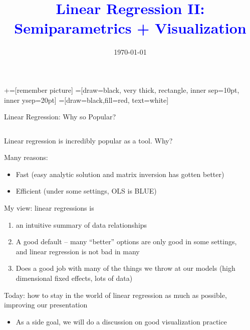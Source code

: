 \documentclass[notes,11pt, aspectratio=169]{beamer}
\title[]{\textcolor{blue}{Linear Regression II: Semiparametrics + Visualization}}
\author[PGP]{}
\institute[FRBNY]{\small{Paul Goldsmith-Pinkham}}
\date{\today}
\newcommand\1{\operatorname{\mathbbm{1}}\indicatorfence}
\newenvironment{wideitemize}{\itemize\addtolength{\itemsep}{10pt}}{\enditemize}
\begin{document}
\newcommand\marktopleft[1]{%
    \tikz[overlay,remember picture] 
        \node (marker-#1-a) at (-.3em,.3em) {};%
}
\newcommand\markbottomright[2]{%
    \tikz[overlay,remember picture] 
        \node (marker-#1-b) at (0em,0em) {};%
}
+=[remember picture] 
 =[draw=black, very thick, rectangle, inner sep=10pt, inner ysep=20pt]
 =[draw=black,fill=red, text=white]

\begin{frame}
\maketitle

\end{frame}

\begin{frame}{Linear Regression: Why so Popular?}
\begin{columns}[T] %
\begin{column}{.8\textwidth}
  \begin{wideitemize}
  \item Linear regression is incredibly popular as a tool. Why? 
  \item Many reasons:
    \begin{itemize}
    \item Fast (easy analytic solution and matrix inversion has gotten better)
    \item Efficient (under some settings, OLS is BLUE)
    \end{itemize}
  \item My view: linear regressions is
    \begin{enumerate}
    \item an intuitive summary of data relationships
    \item A good default -- many ``better'' options are only good in
      some settings, and linear regression is not bad in many
    \item Does a good job with many of the things we throw at our
      models (high dimensional fixed effects, lots of data)
    \end{enumerate}
  \item Today: how to stay in the world of linear regression as much
    as possible, improving our presentation
    \begin{itemize}
    \item As a side goal, we will do a discussion on good visualization practice
    \end{itemize}
  \end{wideitemize}
  \end{column}%
  \hfill%
  \begin{column}{.5\textwidth}
  \end{column}
\end{columns}
\end{frame}
\end{document}
